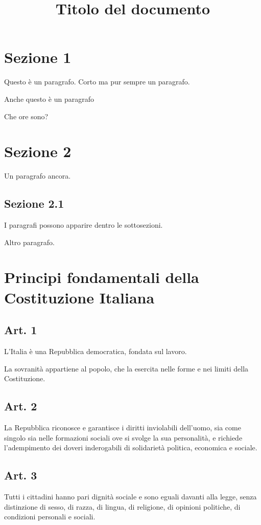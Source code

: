 \documentclass{article}
\title{ Titolo del documento}
\date{}
\author{}
\begin{document}
\maketitle
\section{ Sezione 1}
 Questo è un paragrafo. Corto ma pur sempre un paragrafo.

 Anche questo è un paragrafo

 Che ore sono?

\section{ Sezione 2}
 Un paragrafo ancora.

\subsection{ Sezione 2.1}
 I paragrafi possono apparire dentro le sottosezioni.

 Altro paragrafo.

\section{ Principi fondamentali della Costituzione Italiana}
\subsection{ Art. 1}
 L'Italia è una Repubblica democratica, fondata sul lavoro.

 La sovranità appartiene al popolo, che la esercita nelle forme e nei limiti della Costituzione.

\subsection{ Art. 2}
 La Repubblica riconosce e garantisce i diritti inviolabili dell'uomo, sia come singolo sia nelle formazioni sociali ove si svolge la sua personalità, e richiede l'adempimento dei doveri inderogabili di solidarietà politica, economica e sociale.

\subsection{ Art. 3}
 Tutti i cittadini hanno pari dignità sociale e sono eguali davanti alla legge, senza distinzione di sesso, di razza, di lingua, di religione, di opinioni politiche, di condizioni personali e sociali.
\end{document}
